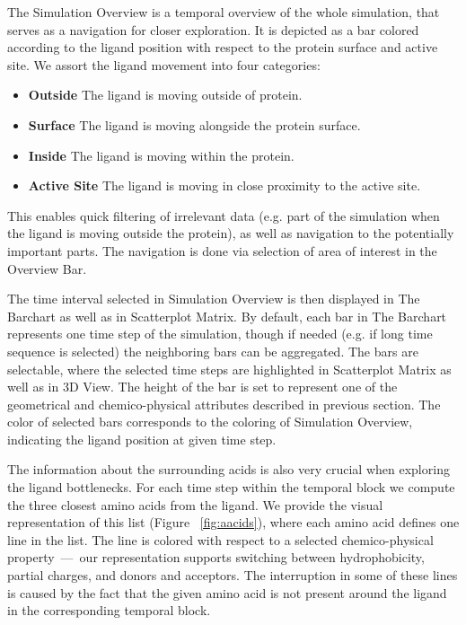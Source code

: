 \documentclass[twocolumn]{bmcart}%
\begin{document}
The Simulation Overview is a temporal overview of the whole simulation, that serves as a navigation for closer exploration.
It is depicted as a bar colored according to the ligand position with respect to the protein surface and active site.
We assort the ligand movement into four categories: 
\begin{itemize}
\item \textbf{Outside} The ligand is moving outside of protein.
\item \textbf{Surface} The ligand is moving alongside the protein surface.
\item \textbf{Inside} The ligand is moving within the protein.
\item \textbf{Active Site} The ligand is moving in close proximity to the active site.
\end{itemize}
This enables quick filtering of irrelevant data (e.g. part of the simulation when the ligand is moving outside the protein), as well as navigation to the potentially important parts.
The navigation is done via selection of area of interest in the Overview Bar.

The time interval selected in Simulation Overview is then displayed in The Barchart as well as in Scatterplot Matrix.
By default, each bar in The Barchart represents one time step of the simulation, though if needed (e.g. if long time sequence is selected) the neighboring bars can be aggregated.
The bars are selectable, where the selected time steps are highlighted in Scatterplot Matrix as well as in 3D View.
The height of the bar is set to represent one of the geometrical and chemico-physical attributes described in previous section.
The color of selected bars corresponds to the coloring of Simulation Overview, indicating the ligand position at given time step.

The information about the surrounding acids is also very crucial when exploring the ligand bottlenecks. 
For each time step within the temporal block we compute the three closest amino acids from the ligand. 
We provide the visual representation of this list (Figure ~\ref{fig:aacids}), where each amino acid defines one line in the list. 
The line is colored with respect to a selected chemico-physical property~---~our representation supports switching between hydrophobicity, partial charges, and donors and acceptors.
The interruption in some of these lines is caused by the fact that the given amino acid is not present around the ligand in the corresponding temporal block.
\end{document}

